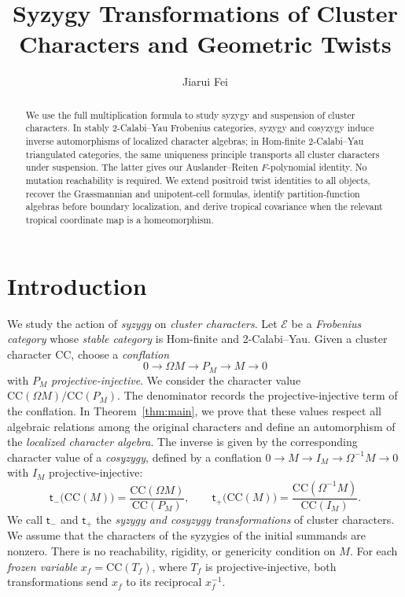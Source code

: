 \documentclass[11pt]{amsart}
\title{Syzygy Transformations of Cluster Characters and Geometric Twists}
\author{Jiarui Fei}
\date{}
\numberwithin{equation}{section}
\theoremstyle{definition}
\theoremstyle{remark}
\newcommand{\E}{\mathcal E}
\newcommand{\CC}{\mathrm{CC}}
\begin{document}
\begin{abstract}
We use the full multiplication formula to study syzygy and suspension of
cluster characters. In stably 2-Calabi--Yau Frobenius categories, syzygy
and cosyzygy induce inverse automorphisms of localized character algebras;
in Hom-finite 2-Calabi--Yau triangulated categories, the same uniqueness
principle transports all cluster characters under suspension. The latter
gives our Auslander--Reiten $F$-polynomial identity. No mutation
reachability is required. We extend positroid twist identities to all
objects, recover the Grassmannian and unipotent-cell formulas, identify
partition-function algebras before boundary localization, and derive
tropical covariance when the relevant tropical coordinate map is a
homeomorphism.
\end{abstract}
\maketitle

\section*{Introduction}

We study the action of \emph{syzygy} on \emph{cluster characters}.
Let $\E$ be a \emph{Frobenius category} whose \emph{stable category}
is Hom-finite and 2-Calabi--Yau. Given a cluster character $\CC$, choose a \emph{conflation}
\[ 0\longrightarrow\Omega M\longrightarrow P_M\longrightarrow M\longrightarrow0 \]
with $P_M$ \emph{projective-injective}. We consider the character value $\CC(\Omega M)/\CC(P_M)$.
The denominator records the projective-injective term of the conflation. In Theorem~\ref{thm:main}, we prove
that these values respect all algebraic relations among the original
characters and define an automorphism of the \emph{localized character
algebra}. The inverse is given by the corresponding character value of
a \emph{cosyzygy}, defined by a conflation
$0\to M\to I_M\to\Omega^{-1}M\to0$ with $I_M$ projective-injective:
\[ \mathsf t_-\bigl(\CC(M)\bigr)=\frac{\CC(\Omega M)}{\CC(P_M)},\qquad \mathsf t_+\bigl(\CC(M)\bigr)=\frac{\CC(\Omega^{-1}M)}{\CC(I_M)}. \]
We call $\mathsf t_-$ and $\mathsf t_+$ the \emph{syzygy and
cosyzygy transformations} of cluster characters. We assume that the characters of the syzygies of the initial summands
are nonzero.
There is no reachability, rigidity, or genericity condition on $M$.
For each \emph{frozen variable} $x_f=\CC(T_f)$, where $T_f$ is
projective-injective, both transformations send $x_f$ to its
reciprocal $x_f^{-1}$.
\end{document}
